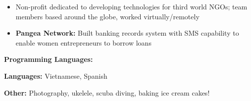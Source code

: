 \documentclass[10pt,a4paper,ragged2e]{altacv}
\begin{document}


\divider \newline
{}
\begin{itemize}
\item {Non-profit dedicated to developing technologies for third world NGOs; team members based around the globe, worked virtually/remotely} \item{\textbf{Pangea Network:} Built banking records system with SMS capability to enable women entrepreneurs to borrow loans}
\end{itemize}



\textbf{Programming Languages:} %
\hspace{-1em}
 \hspace{-2em}  \hspace{-2em} 


\vspace{.5em}
\noindent\textbf{Languages:} Vietnamese, Spanish \smallskip


\noindent\textbf{Other:} Photography, ukelele, scuba diving, baking ice cream cakes!


\end{document}
